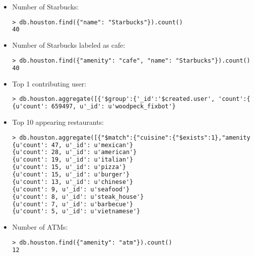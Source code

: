 \documentclass[12pt]{article}
\begin{document}
\begin{itemize}
\item Number of Starbucks:
\begin{lstlisting}[language=xml,breaklines=tr, basicstyle=\small,keywordstyle=\color{blue!70},commentstyle=\color{red!50!green!50!blue!50},frame=shadowbox, rulesepcolor=\color{red!20!green!20!blue!20}]
> db.houston.find({"name": "Starbucks"}).count()
40
\end{lstlisting}

\item Number of Starbucks labeled as cafe:
\begin{lstlisting}[language=xml,breaklines=tr, basicstyle=\small,keywordstyle=\color{blue!70},commentstyle=\color{red!50!green!50!blue!50},frame=shadowbox, rulesepcolor=\color{red!20!green!20!blue!20}]
> db.houston.find({"amenity": "cafe", "name": "Starbucks"}).count()
40
\end{lstlisting}

\item Top 1 contributing user:
\begin{lstlisting}[language=xml,breaklines=tr, basicstyle=\small,keywordstyle=\color{blue!70},commentstyle=\color{red!50!green!50!blue!50},frame=shadowbox, rulesepcolor=\color{red!20!green!20!blue!20}]
> db.houston.aggregate([{'$group':{'_id':'$created.user', 'count':{'$sum':1}}}, {'$sort':{'count':-1}}, {'$limit': 1}]):
{u'count': 659497, u'_id': u'woodpeck_fixbot'}
\end{lstlisting}

\item Top 10 appearing restaurants:
\begin{lstlisting}[language=xml,breaklines=tr, basicstyle=\small,keywordstyle=\color{blue!70},commentstyle=\color{red!50!green!50!blue!50},frame=shadowbox, rulesepcolor=\color{red!20!green!20!blue!20}]
> db.houston.aggregate([{"$match":{"cuisine":{"$exists":1},"amenity":'restaurant'}},{'$group':{'_id':'$cuisine', 'count':{'$sum':1}}}, {'$sort':{'count':-1}}, {'$limit': 10}]):
{u'count': 47, u'_id': u'mexican'}
{u'count': 28, u'_id': u'american'}
{u'count': 19, u'_id': u'italian'}
{u'count': 15, u'_id': u'pizza'}
{u'count': 15, u'_id': u'burger'}
{u'count': 13, u'_id': u'chinese'}
{u'count': 9, u'_id': u'seafood'}
{u'count': 8, u'_id': u'steak_house'}
{u'count': 7, u'_id': u'barbecue'}
{u'count': 5, u'_id': u'vietnamese'}
\end{lstlisting}

\item Number of ATMs:
\begin{lstlisting}[language=xml,breaklines=tr, basicstyle=\small,keywordstyle=\color{blue!70},commentstyle=\color{red!50!green!50!blue!50},frame=shadowbox, rulesepcolor=\color{red!20!green!20!blue!20}]
> db.houston.find({"amenity": "atm"}).count()
12
\end{lstlisting}


\end{itemize}
\end{document}
